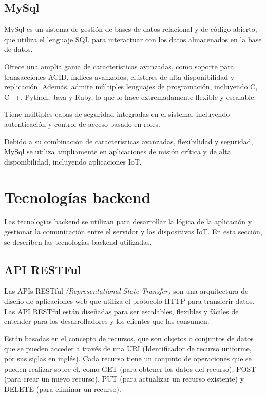 \subsection{MySql}
\label{subsec:mysql}

MySql \citep{WEBSITE:mysql-site} es un sistema de gestión de bases de datos relacional y de código abierto, que utiliza el lenguaje SQL para interactuar con los datos almacenados en la base de datos. 

Ofrece una amplia gama de características avanzadas, como soporte para transacciones ACID, índices avanzados, clústeres de alta disponibilidad y replicación. Además, admite múltiples lenguajes de programación, incluyendo C, C++, Python, Java y Ruby, lo que lo hace extremadamente flexible y escalable.

Tiene múltiples capas de seguridad integradas en el sistema, incluyendo autenticación y control de acceso basado en roles. 

Debido a su combinación de características avanzadas, flexibilidad y seguridad, MySql se utiliza ampliamente en aplicaciones de misión crítica y de alta disponibilidad, incluyendo aplicaciones IoT.

\section{Tecnologías backend}
\label{sec:backend}

Las tecnologías backend se utilizan para desarrollar la lógica de la aplicación y gestionar la comunicación entre el servidor y los dispositivos IoT. En esta sección, se describen las tecnologías backend utilizadas.

\subsection{API RESTFul}
\label{subsec:apis}

Las APIs RESTful \textit{(Representational State Transfer)} son una arquitectura de diseño de aplicaciones web que utiliza el protocolo HTTP para transferir datos. Las API RESTful están diseñadas para ser escalables, flexibles y fáciles de entender para los desarrolladores y los clientes que las consumen.

Están basadas en el concepto de recursos, que son objetos o conjuntos de datos que se pueden acceder a través de una URI (Identificador de recurso uniforme, por sus siglas en inglés). Cada recurso tiene un conjunto de operaciones que se pueden realizar sobre él, como GET (para obtener los datos del recurso), POST (para crear un nuevo recurso), PUT (para actualizar un recurso existente) y DELETE (para eliminar un recurso).

